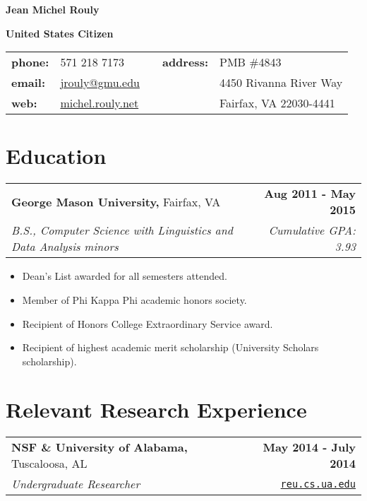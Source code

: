 \documentclass[letterpaper]{article}
\newenvironment{details}
{\begin{itemize}}
{\end{itemize}}
\begin{document}
  \setcounter{secnumdepth}{0}

  {
    \huge
    \noindent
    \textbf{Jean Michel Rouly}
  }

  \noindent\textbf{United States Citizen} \\

  \noindent\begin{tabularx}{\textwidth}{@{}l l X l l@{}}
    \textbf{phone:}  & 571 218 7173                                  & & \textbf{address:} &  PMB \#4843 \\
    \textbf{email:}  & \href{mailto:jrouly@gmu.edu}{jrouly@gmu.edu}  & &                   &  4450 Rivanna River Way \\
    \textbf{web:}    & \href{michel.rouly.net}{michel.rouly.net}     & &                   &  Fairfax, VA 22030-4441
  \end{tabularx}

  \section{Education}
  \noindent
  \begin{tabularx}{\textwidth}{@{}X r@{}}
    \textbf{George Mason University,} Fairfax, VA & \textbf{Aug 2011 - May 2015} \\
    \emph{B.S., Computer Science with Linguistics and Data Analysis minors} & \emph{Cumulative GPA: 3.93} \\[0.2cm]
  \end{tabularx}

  \begin{details}
  \item Dean's List awarded for all semesters attended.
  \item Member of Phi Kappa Phi academic honors society.
  \item Recipient of Honors College Extraordinary Service award.
  \item Recipient of highest academic merit scholarship (University Scholars scholarship).
  \end{details}


  \section{Relevant Research Experience}

  \noindent
  \begin{tabularx}{\textwidth}{@{}X r@{}}
    \textbf{NSF \& University of Alabama,} Tuscaloosa, AL & \textbf{May 2014 - July 2014} \\
    \emph{Undergraduate Researcher} & \texttt{\href{reu.cs.ua.edu}{reu.cs.ua.edu}} \\[0.2cm]
  \end{tabularx}
\end{document}
